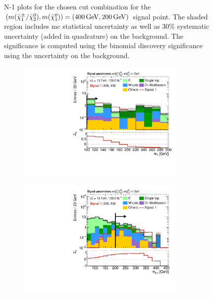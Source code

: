 \begin{figure}
	\caption[N-1 plots for the chosen cut combination for the (400, 200) signal point]{N-1 plots for the chosen cut combination for the $(m(\charg/\neutr), m(\lsp)) = (\SI{400}{\GeV}, \SI{200}{\GeV})$ signal point. The shaded region includes \gls{mc} statistical uncertainty as well as 30\% systematic uncertainty (added in quadrature) on the background. The significance is computed using the binomial discovery significance using the uncertainty on the background.}
	\label{fig:results_n1_400_200}
\end{figure}

\begin{figure}
	\centering
	\begin{subfigure}[b]{0.5\linewidth}
		\centering\includegraphics[width=0.9\textwidth]{N-1_cut_scan/n1_300_150/mt}
	\end{subfigure}\hfill
	\begin{subfigure}[b]{0.5\linewidth}
		\centering\includegraphics[width=0.9\textwidth]{N-1_cut_scan/n1_300_150/mct}

\end{subfigure}
\end{figure}
